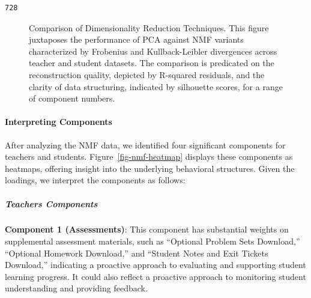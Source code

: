 \documentclass[
  number,
  preprint,
  3p,
  onecolumn]{elsarticle}
\let\oldparagraph\paragraph
\renewcommand{\paragraph}[1]{\oldparagraph{#1}\mbox{}}
\let\oldsubparagraph\subparagraph
\renewcommand{\subparagraph}[1]{\oldsubparagraph{#1}\mbox{}}
\begin{document}
\begin{verbatim}
728
\end{verbatim}

\begin{figure}

\begin{minipage}{\linewidth}



\end{minipage}%
\newline
\begin{minipage}{\linewidth}



\end{minipage}%

\caption{\label{fig-nmf-pca-comparison}Comparison of Dimensionality
Reduction Techniques. This figure juxtaposes the performance of PCA
against NMF variants characterized by Frobenius and Kullback-Leibler
divergences across teacher and student datasets. The comparison is
predicated on the reconstruction quality, depicted by R-squared
residuals, and the clarity of data structuring, indicated by silhouette
scores, for a range of component numbers.}

\end{figure}%

\paragraph{Interpreting Components}\label{interpreting-components}

After analyzing the NMF data, we identified four significant components
for teachers and students. Figure~\ref{fig-nmf-heatmap} displays these
components as heatmaps, offering insight into the underlying behavioral
structures. Given the loadings, we interpret the components as follows:

\subparagraph{Teachers Components}\label{teachers-components}

\textbf{Component 1 (Assessments)}: This component has substantial
weights on supplemental assessment materials, such as ``Optional Problem
Sets Download,'' ``Optional Homework Download,'' and ``Student Notes and
Exit Tickets Download,'' indicating a proactive approach to evaluating
and supporting student learning progress. It could also reflect a
proactive approach to monitoring student understanding and providing
feedback.
\end{document}

